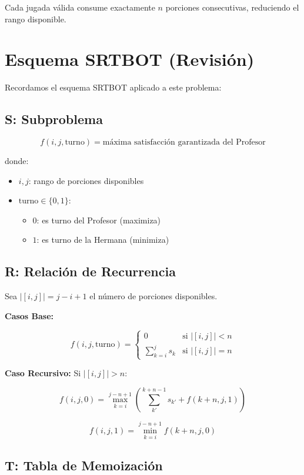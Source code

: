 \documentclass[12pt,letterpaper]{article}
\begin{document}
Cada jugada válida consume exactamente $n$ porciones consecutivas, reduciendo el rango disponible.

\section{Esquema SRTBOT (Revisión)}

Recordamos el esquema SRTBOT aplicado a este problema:

\subsection{S: Subproblema}

$$f(i, j, \text{turno}) = \text{máxima satisfacción garantizada del Profesor}$$

donde:
\begin{itemize}
    \item $i, j$: rango de porciones disponibles
    \item $\text{turno} \in \{0, 1\}$: 
    \begin{itemize}
        \item $0$: es turno del Profesor (maximiza)
        \item $1$: es turno de la Hermana (minimiza)
    \end{itemize}
\end{itemize}

\subsection{R: Relación de Recurrencia}

Sea $|[i,j]| = j - i + 1$ el número de porciones disponibles.

\textbf{Casos Base:}

\begin{equation}
f(i, j, \text{turno}) = \begin{cases}
0 & \text{si } |[i,j]| < n \\
\sum_{k=i}^{j} s_k & \text{si } |[i,j]| = n
\end{cases}
\end{equation}

\textbf{Caso Recursivo:} Si $|[i,j]| > n$:

$$f(i, j, 0) = \max_{k=i}^{j-n+1} \left( \sum_{k'}^{k+n-1} s_{k'} + f(k+n, j, 1) \right)$$

$$f(i, j, 1) = \min_{k=i}^{j-n+1} f(k+n, j, 0)$$

\subsection{T: Tabla de Memoización}
\end{document}
